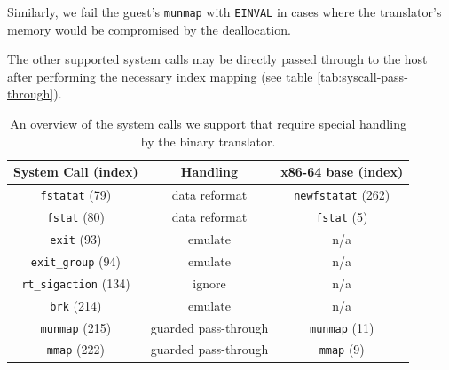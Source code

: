 \begin{description}
	Similarly, we fail the guest's \texttt{munmap} with \texttt{EINVAL} in cases where the translator's memory would be compromised by the deallocation.
\end{description}

The other supported system calls may be directly passed through to the host after performing the necessary index mapping (see table \vref{tab:syscall-pass-through}).

\begin{table}
	\centering
	\begin{tabular}{ccc}
		\toprule
		\textbf{System Call (index)} & \textbf{Handling} & \textbf{x86-64 base (index)}\\ 
		\midrule
		\texttt{fstatat} (79) & data reformat & \texttt{newfstatat} (262)\\
		\texttt{fstat} (80) & data reformat & \texttt{fstat} (5)\\
		\texttt{exit} (93) & emulate & n/a\\
		\texttt{exit\_group} (94) & emulate & n/a\\
		\texttt{rt\_sigaction} (134) & ignore & n/a\\
		\texttt{brk} (214) & emulate & n/a\\
		\texttt{munmap} (215) & guarded pass-through & \texttt{munmap} (11)\\
		\texttt{mmap} (222) & guarded pass-through & \texttt{mmap} (9)\\
		\bottomrule
	\end{tabular}
	\caption{An overview of the system calls we support that require special handling by the binary translator.}
	\label{tab:syscall-special}
\end{table}

